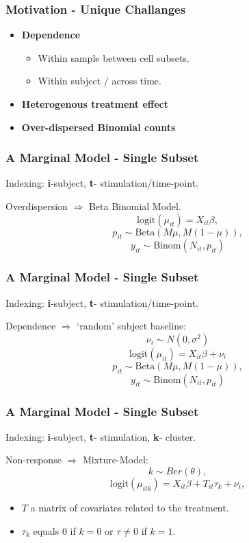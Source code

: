 \documentclass{beamer}
\theoremstyle{definition}
\begin{document}
\begin{frame}
\frametitle{Motivation - Unique Challanges}
\begin{itemize}
\item \textbf{Dependence}
	\begin{itemize}
	\item Within sample between cell subsets.
	\item Within subject / across time.  
	\end{itemize}
\vspace{0.76 cm}
\item \textbf{Heterogenous treatment effect}
\vspace{0.76 cm}
\item \textbf{Over-dispersed Binomial counts}
\end{itemize}
\end{frame}


\begin{frame}
\frametitle{A Marginal Model - Single Subset}
\begin{framed}
Indexing: \textbf{i}-subject, \textbf{t}- stimulation/time-point.
\end{framed}

Overdispersion $\Rightarrow$ Beta Binomial Model.
$$
\text{logit}(\mu_{it}) = X_{it} \beta,
$$$$
p_{it} \sim \text{Beta}(M\mu, M(1 - \mu)),
$$$$
y_{it} \sim \text{Binom}(N_{it}, p_{it})
$$
\end{frame}


\begin{frame}
\frametitle{A Marginal Model - Single Subset}
\begin{framed}
Indexing: \textbf{i}-subject, \textbf{t}- stimulation/time-point.
\end{framed}
Dependence $\Rightarrow$ `random' subject baseline:
$$
\nu_i \sim N(0, \sigma^{2})
$$$$
\text{logit}(\mu_{it}) = X_{it} \beta + \nu_i
$$$$
p_{it} \sim \text{Beta}(M\mu, M(1 - \mu)),
$$$$
y_{it} \sim \text{Binom}(N_{it}, p_{it})
$$

\end{frame}


\begin{frame}
\frametitle{A Marginal Model - Single Subset}
\begin{framed}
Indexing: \textbf{i}-subject, \textbf{t}- stimulation, \textbf{k}- cluster.
\end{framed}

Non-response $\Rightarrow$ Mixture-Model:
$$
k \sim Ber(\theta),
$$$$
\text{logit}(\mu_{itk}) = X_{it} \beta + T_{it}\tau_{k} + \nu_i,
$$
	\begin{itemize}
	\item $T$ a matrix of covariates related to the treatment.
	\item $\tau_k$ equals $0$ if $k=0$ or $\tau\neq0$ if $k = 1$.
	\end{itemize}
\end{frame}
\end{document}

